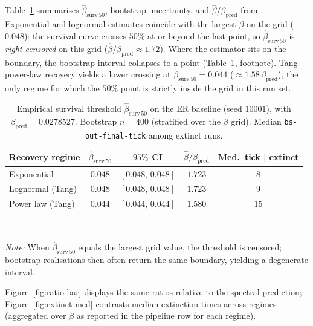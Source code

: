 \documentclass[11pt,a4paper]{article}
\begin{document}
Table~\ref{tab:thresholds} summarises $\hat{\beta}_{\mathrm{surv}\,50}$, bootstrap uncertainty, and $\hat{\beta}/\beta_{\mathrm{pred}}$ from . Exponential and lognormal estimates coincide with the largest $\beta$ on the grid ($0.048$): the survival curve crosses $50\%$ at or beyond the last point, so $\hat{\beta}_{\mathrm{surv}\,50}$ is \emph{right-censored} on this grid ($\hat{\beta}/\beta_{\mathrm{pred}}\approx 1.72$). Where the estimator sits on the boundary, the bootstrap interval collapses to a point (Table~\ref{tab:thresholds}, footnote). Tang power-law recovery yields a lower crossing at $\hat{\beta}_{\mathrm{surv}\,50}=0.044$ ($\approx 1.58\,\beta_{\mathrm{pred}}$), the only regime for which the $50\%$ point is strictly inside the grid in this run set.

\begin{table}[htbp]
  \centering
  \small
  \caption{Empirical survival threshold $\hat{\beta}_{\mathrm{surv}\,50}$ on the ER baseline (seed $10001$), with $\beta_{\mathrm{pred}}=0.0278527$. Bootstrap $n=400$ (stratified over the $\beta$ grid). Median \texttt{bs-out-final-tick} among extinct runs.}
  \label{tab:thresholds}
  \begin{tabular}{lcccc}
    \toprule
    Recovery regime & $\hat{\beta}_{\mathrm{surv}\,50}$ & $95\%$ CI & $\hat{\beta}/\beta_{\mathrm{pred}}$ & Med.\ tick $|$ extinct \\
    \midrule
    Exponential & $0.048$ & $[0.048,\,0.048]$ & $1.723$ & $8$ \\
    Lognormal (Tang) & $0.048$ & $[0.048,\,0.048]$ & $1.723$ & $9$ \\
    Power law (Tang) & $0.044$ & $[0.044,\,0.044]$ & $1.580$ & $15$ \\
    \bottomrule
  \end{tabular}
  \\[0.5em]
  \begin{minipage}{\linewidth}
  \footnotesize
  \emph{Note:} When $\hat{\beta}_{\mathrm{surv}\,50}$ equals the largest grid value, the threshold is censored; bootstrap realisations then often return the same boundary, yielding a degenerate interval.
  \end{minipage}
\end{table}

Figure~\ref{fig:ratio-bar} displays the same ratios relative to the spectral prediction; Figure~\ref{fig:extinct-med} contrasts median extinction times across regimes (aggregated over $\beta$ as reported in the pipeline row for each regime).
\end{document}
